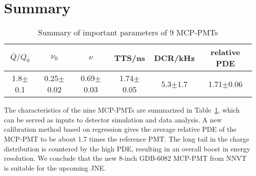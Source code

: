\section{Summary}
\label{Summary}
\begin{table}
    \centering
    \caption{Summary of important parameters of 9 MCP-PMTs}
    \label{tab:summary}
    \begin{tabular}{|c|c|c|c|c|c|}
        \hline
        $\overline{Q}/Q_0$&$\nu_0$&$\nu$&TTS/ns&DCR/kHz&relative PDE\\
        \hline
        1.8$\pm$0.1&0.25$\pm$0.02&0.69$\pm$0.03&1.74$\pm$0.05&5.3$\pm$1.7&1.71$\pm$0.06\\
        \hline
    \end{tabular}
\end{table}

The characteristics of the nine MCP-PMTs are summarized in Table~\ref{tab:summary}, which can be served as inputs to detector simulation and data analysis. A new calibration method based on regression gives the average relative PDE of the MCP-PMT to be about 1.7 times the reference PMT. The long tail in the charge distribution is countered by the high PDE, resulting in an overall boost in energy resolution. We conclude that the new 8-inch GDB-6082 MCP-PMT from NNVT is suitable for the upcoming JNE.